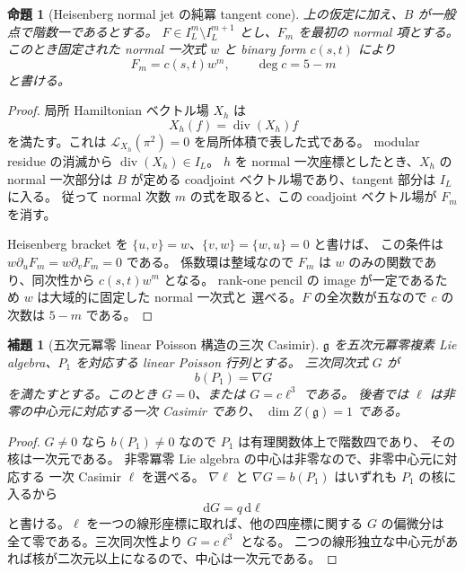 \documentclass[11pt,a4paper]{ltjsarticle}
\newtheorem{lemma}[theorem]{補題}
\newtheorem{proposition}[theorem]{命題}
\theoremstyle{remark}\newtheorem{remark}[theorem]{注意}
\begin{document}
\begin{proposition}[Heisenberg normal jet の純冪 tangent cone]
\label{prop:heisenberg-pure-power}
上の仮定に加え、$B$ が一般点で階数一であるとする。
$F\in I_L^m\setminus I_L^{m+1}$ とし、$F_m$ を最初の normal 項とする。
このとき固定された normal 一次式 $w$ と binary form $c(s,t)$ により
\[
                  F_m=c(s,t)w^m,\qquad \deg c=5-m
\]
と書ける。
\end{proposition}
\begin{proof}
局所 Hamiltonian ベクトル場 $X_h$ は
\[
                    X_h(f)=\operatorname{div}(X_h)f
\]
を満たす。これは $\mathcal L_{X_h}(\pi^2)=0$ を局所体積で表した式である。
modular residue の消滅から $\operatorname{div}(X_h)\in I_L$。
$h$ を normal 一次座標としたとき、$X_h$ の normal 一次部分は
$B$ が定める coadjoint ベクトル場であり、tangent 部分は $I_L$ に入る。
従って normal 次数 $m$ の式を取ると、この coadjoint ベクトル場が $F_m$ を消す。

Heisenberg bracket を $\{u,v\}=w$、$\{v,w\}=\{w,u\}=0$ と書けば、
この条件は $w\partial_uF_m=w\partial_vF_m=0$ である。
係数環は整域なので $F_m$ は $w$ のみの関数であり、同次性から $c(s,t)w^m$ となる。
rank-one pencil の image が一定であるため $w$ は大域的に固定した normal 一次式と
選べる。$F$ の全次数が五なので $c$ の次数は $5-m$ である。
\end{proof}



\begin{lemma}[五次元冪零 linear Poisson 構造の三次 Casimir]
\label{lem:nilpotent-cubic}
$\mathfrak g$ を五次元冪零複素 Lie algebra、$P_1$ を対応する linear Poisson 行列とする。
三次同次式 $G$ が
\[
                             b(P_1)=\nabla G
\]
を満たすとする。このとき $G=0$、または $G=c\ell^3$ である。
後者では $\ell$ は非零の中心元に対応する一次 Casimir であり、
$\dim Z(\mathfrak g)=1$ である。
\end{lemma}
\begin{proof}
$G\ne0$ なら $b(P_1)\ne0$ なので $P_1$ は有理関数体上で階数四であり、
その核は一次元である。
非零冪零 Lie algebra の中心は非零なので、非零中心元に対応する
一次 Casimir $\ell$ を選べる。
$\nabla\ell$ と $\nabla G=b(P_1)$ はいずれも $P_1$ の核に入るから
\[
                              \mathrm dG=q\,\mathrm d\ell
\]
と書ける。$\ell$ を一つの線形座標に取れば、他の四座標に関する $G$ の偏微分は
全て零である。三次同次性より $G=c\ell^3$ となる。
二つの線形独立な中心元があれば核が二次元以上になるので、中心は一次元である。
\end{proof}
\end{document}
